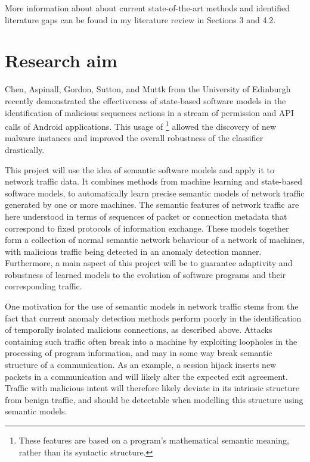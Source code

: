 \documentclass[a4paper,12pt,twoside]{report}
\begin{document}
More information about about current state-of-the-art methods and identified literature gaps can be found in my literature review in Sections 3 and 4.2.

\section{Research aim}

Chen, Aspinall, Gordon, Sutton, and Muttk \cite{chen_2016_robust,chen_more_2016} from the University of Edinburgh recently demonstrated the effectiveness of state-based software models in the identification of malicious sequences actions in a stream of permission and API calls of Android applications. This usage of \footnote{These features are based on a program's mathematical semantic meaning, rather than its syntactic structure.} allowed the discovery of new malware instances and improved the overall robustness of the classifier drastically. 

This project will use the idea of semantic software models and apply it to network traffic data. It combines methods from machine learning and state-based software models, to automatically learn precise semantic models of network traffic generated by one or more machines. The semantic features of network traffic are here understood in terms of sequences of packet or connection metadata that correspond to fixed protocols of information exchange. These models together form a collection of normal semantic network behaviour of a network of machines, with malicious traffic being detected in an anomaly detection manner. Furthermore, a main aspect of this project will be to guarantee adaptivity and robustness of learned models to the evolution of software programs and their corresponding traffic. 

One motivation for the use of semantic models in network traffic stems from the fact that current anomaly detection methods perform poorly in the identification of temporally isolated malicious connections, as described above. Attacks containing such traffic often break into a machine by exploiting loopholes in the processing of program information, and may in some way  break semantic structure of a communication. As an example, a session hijack inserts new packets in a communication and will likely alter the expected exit agreement. Traffic with malicious intent will therefore likely deviate in its intrinsic structure from benign traffic, and should be detectable when modelling this structure using semantic models.
\end{document}

